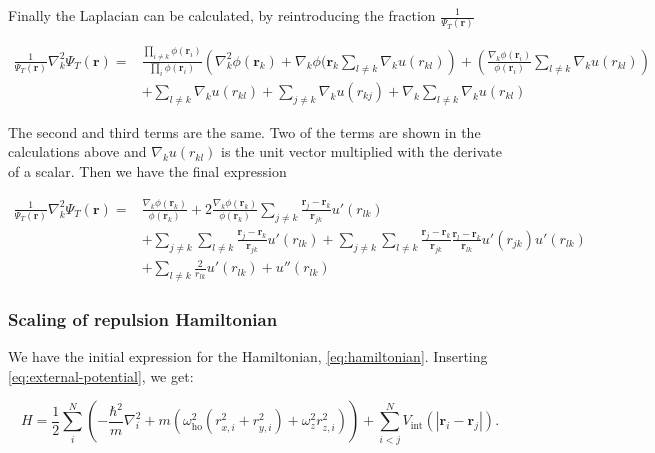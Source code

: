 \documentclass[
]{article}
\begin{document}
Finally the Laplacian can be calculated, by reintroducing the fraction
\(\frac{1}{\Psi_T(\mathbf{r})}\)

\begin{align*}
\frac{1}{\Psi_T(\mathbf{r})} \nabla_k^2 \Psi_T(\mathbf{r}) = &\frac{\prod_{i \ne k} \phi(\mathbf{r}_i)}{\prod _{i} \phi(\mathbf{r}_i)} \left(\nabla^2_k \phi(\mathbf{r}_k) + \nabla_k \phi(\mathbf{r}_k \sum _{l\ne k}\nabla_k u(r _{kl})\right)  + \left( \frac{\nabla_k \phi(\mathbf{r}_i)}{\phi(\mathbf{r}_i)} \sum _{l \ne k} \nabla_k u(r _{kl})\right) \\ &+ \sum _{l \ne k} \nabla_k u(r _{kl})  + \sum _{j \ne k} \nabla_k u(r _{kj}) + \nabla_k  \sum _{l \ne k} \nabla_k u(r _{kl})
\end{align*}

The second and third terms are the same. Two of the terms are shown in
the calculations above and \(\nabla_k u(r_{kl})\) is the unit vector
multiplied with the derivate of a scalar. Then we have the final
expression

\begin{align*}
\frac{1}{\Psi_T(\mathbf{r})} \nabla_k^2 \Psi_T(\mathbf{r}) = &\frac{\nabla_k \phi(\mathbf{r}_k)}{\phi(\mathbf{r}_k)} + 2 \frac{\nabla_k \phi(\mathbf{r}_k)}{\phi(\mathbf{r}_k)}\sum _{j\ne k}
\frac{\mathbf{r}_j - \mathbf {r}_k}{\mathbf{r} _{jk}}u'(r _{lk}) \\ &+ \sum _{j\ne k}\sum _{l\ne k}
\frac{\mathbf{r}_j - \mathbf {r}_k}{\mathbf{r} _{jk}} u'(r _{lk}) + \sum _{j\ne k}\sum _{l\ne k}
\frac{\mathbf{r}_j - \mathbf {r}_k}{\mathbf{r} _{jk}} \frac{\mathbf{r}_l - \mathbf {r}_k}{\mathbf{r} _{lk}}  u'(r _{jk})  u'(r _{lk}) \\ &+ \sum _{l\ne k} \frac{2}{r _{lk}} u'(r _{lk}) +  u''(r _{lk})
\end{align*}

\hypertarget{sec:scaled_ham}{%
\subsubsection{Scaling of repulsion Hamiltonian}\label{sec:scaled_ham}}

We have the initial expression for the Hamiltonian,
\eqref{eq:hamiltonian}. Inserting \eqref{eq:external-potential}, we get:

\[ H = \frac{1}{2}\sum_i^N \left(-\frac{\hbar^2}{m}\nabla^2_i + m\left(\omega_\text{ho}^2 (r_{x, i}^2 + r_{y, i}^2) + \omega_z^2 r_{z, i}^2\right)\right) + \sum_{i<j}^N V_\text{int}(|\mathbf r_i - \mathbf r_j|) .\]
\end{document}
